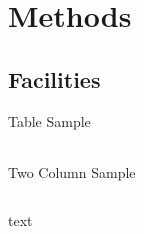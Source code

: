 
% 
%
\section{Methods}

\subsection{Facilities}

\begin{frame}{Table Sample}
\begin{table}[h]
\begin{tabular}{c | c c c}
\end{tabular}
\end{table}
\end{frame}

\begin{frame}{Two Column Sample}
\begin{columns}[onlytextwidth]
\begin{column}{0.45\textwidth}
	text
\end{column}
\begin{column}{0.45\textwidth}
	\begin{figure}
	
	\end{figure}
\end{column}
\end{columns}
\end{frame}


